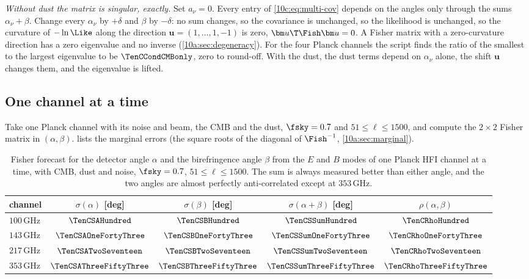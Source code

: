 \emph{Without dust the matrix is singular, exactly.} Set $a_\nu=0$. Every entry of \eqref{10c:eq:multi-cov} depends
on the angles only through the sums $\alpha_\nu+\beta$. Change every $\alpha_\nu$ by $+\delta$ and $\beta$ by $-\delta$: no
sum changes, so the covariance is unchanged, so the likelihood is unchanged, so the curvature of $-\ln\Like$ along
the direction $\bm u=(1,\dots,1,-1)$ is zero, $\bm u\T\Fish\bm u=0$. A Fisher matrix with a zero-curvature direction has
a zero eigenvalue and no inverse (\cref{10a:sec:degeneracy}). For the four Planck channels the script finds the
ratio of the smallest to the largest eigenvalue to be $\TenCCondCMBonly$, zero to round-off. With the dust, the
dust terms depend on $\alpha_\nu$ alone, the shift $\bm u$ changes them, and the eigenvalue is lifted.

\subsection{One channel at a time}
\label{10c:sec:single}

Take one Planck channel with its noise and beam, the CMB and the dust, $\fsky=0.7$ and $51\le\ell\le1500$, and
compute the $2\times2$ Fisher matrix in $(\alpha,\beta)$.  lists the marginal errors (the square roots
of the diagonal of $\Fish^{-1}$, \cref{10a:sec:marginal}).

\begin{table}[htbp]
\centering
\small
\begin{tabular}{@{}lcccc@{}}
\toprule
channel & $\sigma(\alpha)$ [deg] & $\sigma(\beta)$ [deg] & $\sigma(\alpha+\beta)$ [deg] & $\rho(\alpha,\beta)$\\\midrule
$100\,$GHz & $\TenCSAHundred$ & $\TenCSBHundred$ & $\TenCSSumHundred$ & $\TenCRhoHundred$\\
$143\,$GHz & $\TenCSAOneFortyThree$ & $\TenCSBOneFortyThree$ & $\TenCSSumOneFortyThree$ & $\TenCRhoOneFortyThree$\\
$217\,$GHz & $\TenCSATwoSeventeen$ & $\TenCSBTwoSeventeen$ & $\TenCSSumTwoSeventeen$ & $\TenCRhoTwoSeventeen$\\
$353\,$GHz & $\TenCSAThreeFiftyThree$ & $\TenCSBThreeFiftyThree$ & $\TenCSSumThreeFiftyThree$ & $\TenCRhoThreeFiftyThree$\\
\bottomrule
\end{tabular}
\caption{Fisher forecast for the detector angle $\alpha$ and the birefringence angle $\beta$ from the $E$ and $B$ modes of one
Planck HFI channel at a time, with CMB, dust and noise, $\fsky=0.7$, $51\le\ell\le1500$. The sum is always measured
better than either angle, and the two angles are almost perfectly anti-correlated except at $353\,$GHz.}
\label{10c:tab:single}
\end{table}

